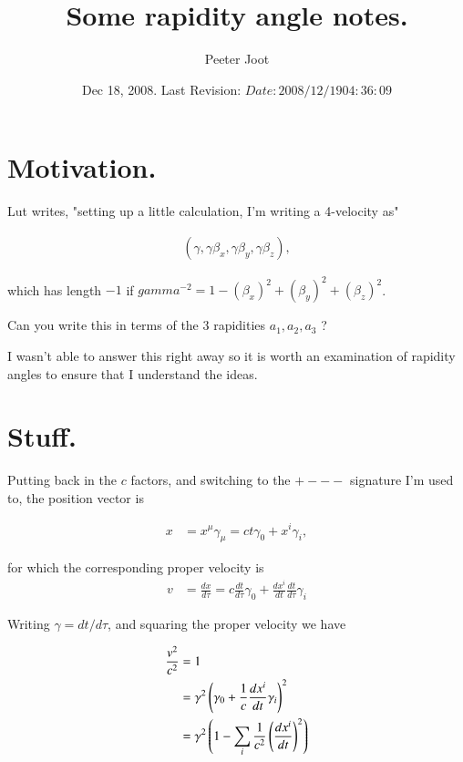 \documentclass{article}
\title{ Some rapidity angle notes. }
\author{Peeter Joot}
\date{ Dec 18, 2008.  Last Revision: $Date: 2008/12/19 04:36:09 $ }
\begin{document}
\maketitle{}

\section{ Motivation. }

Lut writes, "setting up a little calculation, I'm writing a 4-velocity as"
 
\begin{align*}
( \gamma, \gamma \beta_x, \gamma \beta_y, \gamma \beta_z ),
\end{align*}
 
which has length $-1$ if $gamma^{-2} = 1 - (\beta_x)^2+(\beta_y)^2+(\beta_z)^2$.
 
Can you write this in terms of the 3 rapidities $a_1, a_2, a_3$ ?

I wasn't able to answer this right away so it is worth an examination
of rapidity angles to ensure that I understand the ideas.

\section{ Stuff. }

Putting back in the $c$ factors, and switching to the $+---$ signature I'm used to, the position
vector is

\begin{align*}
x &= x^\mu \gamma_\mu = ct \gamma_0 + x^i \gamma_i,
\end{align*}

for which the corresponding proper velocity is
\begin{align*}
v &= \frac{dx}{d\tau} = c \frac{dt}{d\tau} \gamma_0 + \frac{dx^i}{dt} \frac{dt}{d\tau} \gamma_i
\end{align*}

Writing $\gamma = dt/d\tau$, and squaring the proper velocity we have

\begin{align*}
\frac{v^2}{c^2}
&= 1 \\
&= \gamma^2 \left(\gamma_0 + \frac{1}{c}\frac{dx^i}{dt} \gamma_i\right)^2 \\
&= \gamma^2 \left(1 - \sum_i \frac{1}{c^2} \left(\frac{dx^i}{dt}\right)^2 \right) \\
\end{align*}
\end{document}
